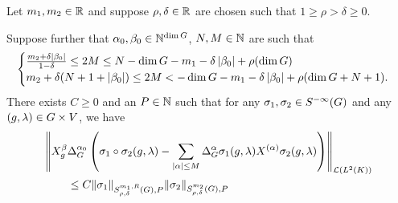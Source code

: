 \begin{lemma}
\label{lemma:prepare_composition_formula}
    Let $m_1, m_2 \in \mathbb{R}$ and suppose $\rho, \delta \in \mathbb{R}$ are chosen such that $1 \geq \rho > \delta \geq 0$.

    Suppose further that $\alpha_0, \beta_0 \in \mathbb{N}^{\dim G}$, $N, M \in \mathbb{N}$ are such that
    \begin{align}
        \begin{cases}
            \frac {m_2 + \delta \left|{\beta_{0}}\right|} {1 - \delta} \leq 2 M
            \leq N - \dim G - m_1 - \delta \left|{\beta_0}\right| + \rho (\dim G)\\
            m_2 + \delta(N + 1 + \left|{\beta_0}\right|)
            \leq 2M <
            -\dim G - m_1 - \delta \left|{\beta_0}\right| + \rho (\dim G + N + 1).
        \end{cases}
        \label{eq:composition_formula:conditions_on_M}
    \end{align}
    There exists $C \geq 0$ and an $P \in \mathbb{N}$ such that
    for any $\sigma_1, \sigma_2 \in {S^{-\infty} (G)}$ and any $(g, \lambda) \in G \times V$,
    we have
    \begin{align*}
        &\norm [\Lin {\Lebesgue 2 \CompactGroup}] {%
            \LeftDifferentialOperator [g] \beta \DifferenceOperatorOrder {\alpha_0} \left(
                \sigma_1 \circ \sigma_2(g, \lambda)
                - \sum_{\abs \alpha \leq M} \DifferenceOperatorOrder \alpha \sigma_1(g, \lambda) \TaylorLeftDifferentialOperator \alpha \sigma_2(g, \lambda)
            \right)
        }\\
        &\qquad \leq C \SymbolSemiNorm {m_1, R} {\rho, \delta} P {\sigma_1} \SymbolSemiNorm {m_2} {\rho, \delta} P {\sigma_2}
    \end{align*}
\end{lemma}
